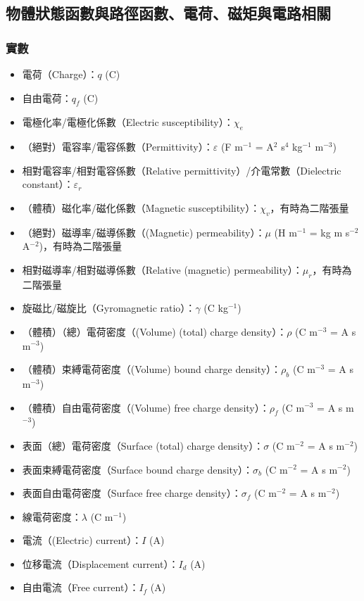 \documentclass[a4paper,12pt]{report}
\begin{document}
\begin{itemize}
\subsection{物體狀態函數與路徑函數、電荷、磁矩與電路相關}
\subsubsection{實數}
\begin{itemize}
\item 電荷（Charge）：$q$ (C)
\item 自由電荷：$q_f$ (C)
\item 電極化率/電極化係數（Electric susceptibility）：$\chi_e$
\item （絕對）電容率/電容係數（Permittivity）：$\varepsilon$ (F m$^{-1}$ = A$^2$ s$^4$ kg$^{-1}$ m$^{-3}$)
\item 相對電容率/相對電容係數（Relative permittivity）/介電常數（Dielectric constant）：$\varepsilon_r$
\item （體積）磁化率/磁化係數（Magnetic susceptibility）：$\chi_v$，有時為二階張量
\item （絕對）磁導率/磁導係數（(Magnetic) permeability）：$\mu$ (H m$^{-1}$ = kg m s$^{-2}$ A$^{-2}$)，有時為二階張量
\item 相對磁導率/相對磁導係數（Relative (magnetic) permeability）：$\mu_r$，有時為二階張量
\item 旋磁比/磁旋比（Gyromagnetic ratio）：$\gamma$ (C kg$^{-1}$)
\item （體積）（總）電荷密度（(Volume) (total) charge density）：$\rho$ (C m$^{-3}$ = A s m$^{-3}$)
\item （體積）束縛電荷密度（(Volume) bound charge density）：$\rho_b$ (C m$^{-3}$ = A s m$^{-3}$)
\item （體積）自由電荷密度（(Volume) free charge density）：$\rho_f$ (C m$^{-3}$ = A s m$^{-3}$)
\item 表面（總）電荷密度（Surface (total) charge density）：$\sigma$ (C m$^{-2}$ = A s m$^{-2}$)
\item 表面束縛電荷密度（Surface bound charge density）：$\sigma_b$ (C m$^{-2}$ = A s m$^{-2}$)
\item 表面自由電荷密度（Surface free charge density）：$\sigma_f$ (C m$^{-2}$ = A s m$^{-2}$)
\item 線電荷密度：$\lambda$ (C m$^{-1}$)
\item 電流（(Electric) current）：$I$ (A)
\item 位移電流（Displacement current）：$I_d$ (A)
\item 自由電流（Free current）：$I_f$ (A)

\end{itemize}
\end{itemize}
\end{document}
